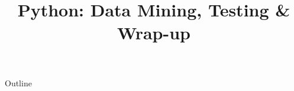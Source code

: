 \documentclass[xcolor=dvipsnames,compress,t,pdf]{beamer}
\title[\insertframenumber /\inserttotalframenumber]{Python: Data Mining, Testing \& Wrap-up}
\begin{document}
	\begin{frame}
	\titlepage
	\end{frame}

	\begin{frame}{Outline}
	    \tableofcontents
	\end{frame}

	
	
	
\end{document}
